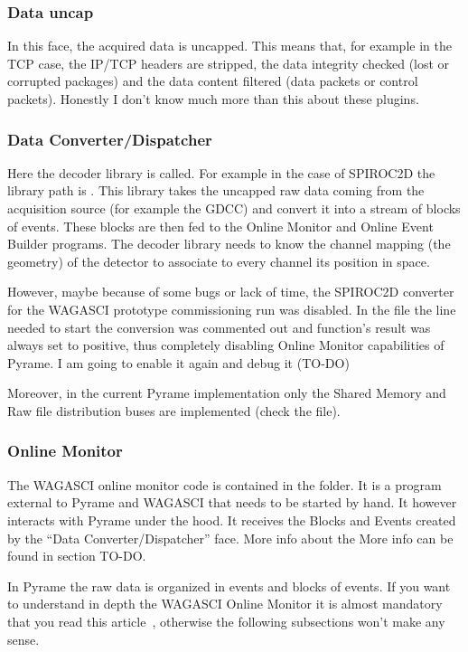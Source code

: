 \subsubsection{Data uncap}
In this face, the acquired data is uncapped. This means that, for
example in the TCP case, the IP/TCP headers are stripped, the data
integrity checked (lost or corrupted packages) and the data content
filtered (data packets or control packets). Honestly I don't know much
more than this about these plugins.

\subsubsection{Data Converter/Dispatcher}
Here the decoder library is called. For example in the case of
SPIROC2D the library path is . This
library takes the uncapped raw data coming from the acquisition source
(for example the GDCC) and convert it into a stream of blocks of
events. These blocks are then fed to the Online Monitor and Online
Event Builder programs.  The decoder library needs to know the channel
mapping (the geometry) of the detector to associate to every channel
its position in space.

However, maybe because of some bugs or lack of time, the SPIROC2D
converter for the WAGASCI prototype commissioning run was disabled. In
the  file the line needed to start the
conversion was commented out and function's result was always set to
positive, thus completely disabling Online Monitor capabilities of
Pyrame. I am going to enable it again and debug it (TO-DO)

Moreover, in the current Pyrame implementation only the Shared Memory
and Raw file distribution buses are implemented (check the
 file).

\subsubsection{Online Monitor}
The WAGASCI online monitor code is contained in the
 folder. It is a program external
to Pyrame and WAGASCI that needs to be started by hand. It however
interacts with Pyrame under the hood. It receives the Blocks and
Events created by the ``Data Converter/Dispatcher'' face. More info
about the More info can be found in section TO-DO.\@

In Pyrame the raw data is organized in events and blocks of events. If
you want to understand in depth the WAGASCI Online Monitor it is
almost mandatory that you read this article~\cite{Rubio-Roy:2017nco},
otherwise the following subsections won't make any sense.

